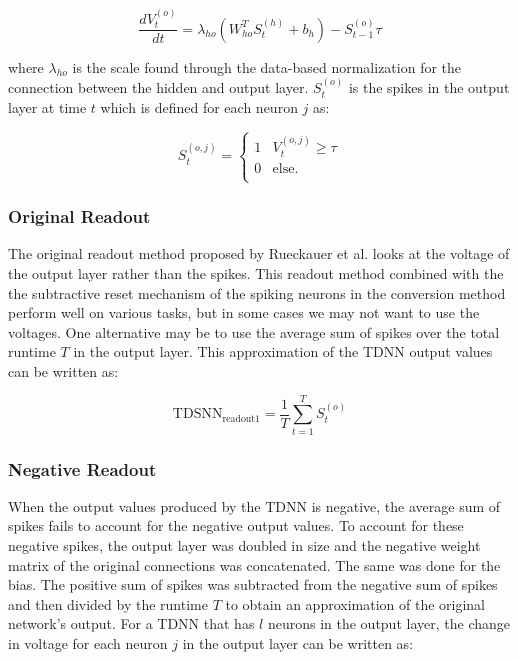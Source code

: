 \documentclass{article}
\begin{document}
\begin{equation}
    \frac{dV^{\left(o\right)}_t}{dt} = \lambda_{ho} \left(W_{ho}^TS^{\left(h\right)}_{t} + b_h\right) - S^{\left(o\right)}_{t-1} \tau
\end{equation}

where $\lambda_{ho}$ is the scale found through the data-based normalization for the connection between the hidden and output layer. $S^{\left(o\right)}_{t}$ is the spikes in the output layer at time $t$ which is defined for each neuron $j$ as:

\begin{equation}
    S^{\left(o,j\right)}_{t} = \begin{cases} 1 & V^{\left(o,j\right)}_{t}\geq \tau \\
      0 & \text{else.} \\ \end{cases}
\end{equation}

\subsubsection*{Original Readout}
The original readout method proposed by Rueckauer et al. looks at the voltage of the output layer rather than the spikes. This readout method combined with the the subtractive reset mechanism of the spiking neurons in the conversion method perform well on various tasks, \cite{rueckauer2017conversion} but in some cases we may not want to use the voltages. One alternative may be to use the average sum of spikes over the total runtime $T$ in the output layer. This approximation of the TDNN output values can be written as:

\begin{equation}
    \text{TDSNN}_{\text{readout1}} = \frac{1}{T} \sum_{t=1}^{T}{S_t^{\left(o\right)}}
\end{equation}


\subsubsection*{Negative Readout}
When the output values produced by the TDNN is negative, the average sum of spikes fails to account for the negative output values. To account for these negative spikes, the output layer was doubled in size and the negative weight matrix of the original connections was concatenated. The same was done for the bias. The positive sum of spikes was subtracted from the negative sum of spikes and then divided by the runtime $T$ to obtain an approximation of the original network's output. For a TDNN that has $l$ neurons in the output layer, the change in voltage for each neuron $j$ in the output layer can be written as:
\end{document}
